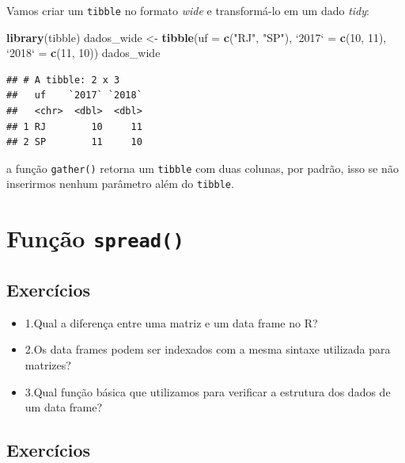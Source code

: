 \documentclass[]{book}
\newenvironment{Shaded}{\begin{snugshade}}{\end{snugshade}}
\newcommand{\DataTypeTok}[1]{\textcolor[rgb]{0.13,0.29,0.53}{#1}}
\newcommand{\DecValTok}[1]{\textcolor[rgb]{0.00,0.00,0.81}{#1}}
\newcommand{\KeywordTok}[1]{\textcolor[rgb]{0.13,0.29,0.53}{\textbf{#1}}}
\newcommand{\NormalTok}[1]{#1}
\newcommand{\StringTok}[1]{\textcolor[rgb]{0.31,0.60,0.02}{#1}}
\providecommand{\tightlist}{%
  \setlength{\itemsep}{0pt}\setlength{\parskip}{0pt}}
\begin{document}
Vamos criar um \texttt{tibble} no formato \emph{wide} e transformá-lo em um dado \emph{tidy}:

\begin{Shaded}
\begin{Highlighting}[]
\KeywordTok{library}\NormalTok{(tibble)}
\NormalTok{dados_wide <-}\StringTok{ }\KeywordTok{tibble}\NormalTok{(}\DataTypeTok{uf =} \KeywordTok{c}\NormalTok{(}\StringTok{"RJ"}\NormalTok{, }\StringTok{"SP"}\NormalTok{), }\StringTok{`}\DataTypeTok{2017}\StringTok{`}\NormalTok{ =}\StringTok{ }\KeywordTok{c}\NormalTok{(}\DecValTok{10}\NormalTok{, }\DecValTok{11}\NormalTok{), }\StringTok{`}\DataTypeTok{2018}\StringTok{`}\NormalTok{ =}\StringTok{ }\KeywordTok{c}\NormalTok{(}\DecValTok{11}\NormalTok{, }\DecValTok{10}\NormalTok{))}
\NormalTok{dados_wide}
\end{Highlighting}
\end{Shaded}

\begin{verbatim}
## # A tibble: 2 x 3
##   uf    `2017` `2018`
##   <chr>  <dbl>  <dbl>
## 1 RJ        10     11
## 2 SP        11     10
\end{verbatim}

a função \texttt{gather()} retorna um \texttt{tibble} com duas colunas, por padrão, isso se não inserirmos nenhum parâmetro além do \texttt{tibble}.

\hypertarget{funuxe7uxe3o-spread}{%
\section{\texorpdfstring{Função \texttt{spread()}}{Função spread()}}\label{funuxe7uxe3o-spread}}

\hypertarget{exercuxedcios}{%
\subsection{Exercícios}\label{exercuxedcios}}

\begin{itemize}
\tightlist
\item
  1.Qual a diferença entre uma matriz e um data frame no R?
\item
  2.Os data frames podem ser indexados com a mesma sintaxe utilizada para matrizes?
\item
  3.Qual função básica que utilizamos para verificar a estrutura dos dados de um data frame?
\end{itemize}

\hypertarget{exercuxedcios-1}{%
\subsection{Exercícios}\label{exercuxedcios-1}}
\end{document}
